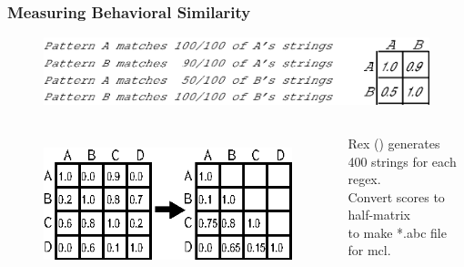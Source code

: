 \begin{frame}
\frametitle{Measuring Behavioral Similarity}
\begin{figure}[ht]
  \centering
  \includegraphics[scale=0.65]{nontex/illustrations/minimalMatrix.eps}
  \label{fig:minimalMatrix}
\end{figure}

\begin{columns}[t] %
\begin{figure}[h]
  \centering
  \includegraphics[scale=1]{nontex/illustrations/matrixToGraph.eps}
  \label{fig:matrixToGraph}
\end{figure}
\begin{center}
Rex (\cite{Rex}) generates \\
400 strings for each regex.\\
Convert scores to half-matrix\\
to make *.abc file for mcl.
\end{center}
\end{columns}
\end{frame}



